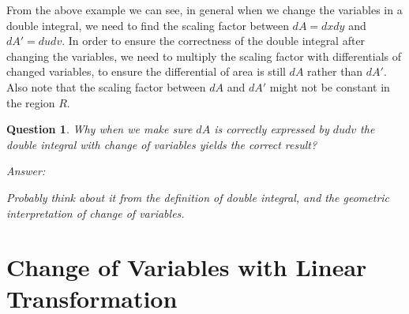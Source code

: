 \documentclass{article}
\newtheorem*{question}{Question}
\begin{document}
From the above example we can see, in general when we change the variables in a 
double integral, we need to find the scaling factor between $dA = dx dy$ and 
$dA' = du dv$. In order to ensure the correctness of the double integral after 
changing the variables, we need to multiply the scaling factor with 
differentials of changed variables, to ensure the differential of area is still 
$dA$ rather than $dA'$. Also note that the scaling factor between $dA$ and $dA'$ 
might not be constant in the region $R$.

\begin{question}
  Why when we make sure $dA$ is correctly expressed by $du dv$ the double 
  integral with change of variables yields the correct result?

  Answer:

  Probably think about it from the definition of double integral, and the 
  geometric interpretation of change of variables.
\end{question}

\section{Change of Variables with Linear Transformation}
\end{document}
